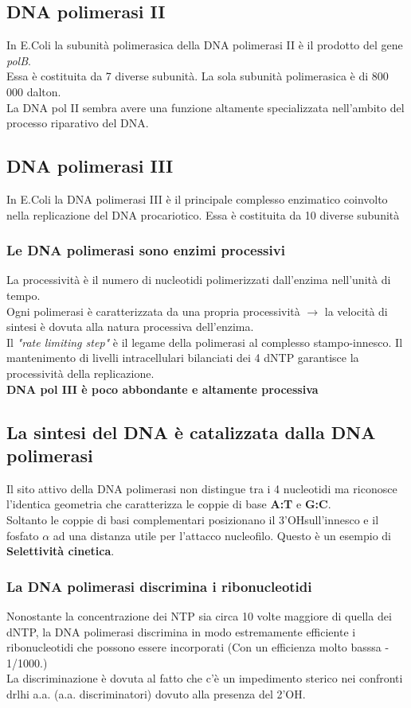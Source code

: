 \documentclass{article}
\begin{document}
\subsection{DNA polimerasi II} In E.Coli la subunità polimerasica della DNA polimerasi II è il prodotto del gene \textit{polB}.\\ Essa è costituita da 7 diverse subunità. La sola subunità polimerasica è di 800 000 dalton.\\ La DNA pol II sembra avere una funzione altamente specializzata nell'ambito del processo riparativo del DNA.
\subsection{DNA polimerasi III} In E.Coli la DNA polimerasi III è il principale complesso enzimatico coinvolto nella replicazione del DNA procariotico. Essa è costituita da 10 diverse subunità
\subsubsection{Le DNA polimerasi sono enzimi processivi} 
La processività è il numero di nucleotidi polimerizzati dall'enzima nell'unità di tempo.\\
Ogni polimerasi è caratterizzata da una propria processività $\rightarrow$ la velocità di sintesi è dovuta alla natura processiva dell'enzima.\\
Il \textit{"rate limiting step"} è il legame della polimerasi al complesso stampo-innesco. Il mantenimento di livelli intracellulari bilanciati dei 4 dNTP garantisce la processività della replicazione.\\
\textbf{DNA pol III è poco abbondante e altamente processiva}
\subsection{La sintesi del DNA è catalizzata dalla DNA polimerasi} Il sito attivo della DNA polimerasi non distingue tra i 4 nucleotidi ma riconosce l'identica geometria che caratterizza le coppie di base \textbf{A:T} e \textbf{G:C}.\\
Soltanto le coppie di basi complementari posizionano il 3'OHsull'innesco e il fosfato $ \alpha $ ad una distanza utile per l'attacco nucleofilo. Questo è un esempio di \textbf{Selettività cinetica}.\\
\subsubsection{La DNA polimerasi discrimina i ribonucleotidi} Nonostante la concentrazione dei NTP sia circa 10 volte maggiore di quella dei dNTP, la DNA polimerasi discrimina in modo estremamente efficiente i ribonucleotidi che possono essere incorporati (Con un efficienza molto basssa - 1/1000.)\\
La discriminazione è dovuta al fatto che c'è un impedimento sterico nei confronti drlhi a.a. (a.a. discriminatori) dovuto alla presenza del 2'OH.
\end{document}
